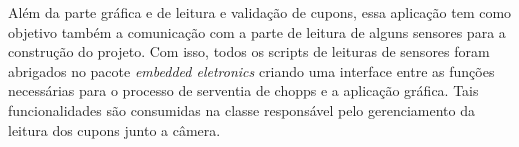             Além da parte gráfica e de leitura e validação de cupons, essa aplicação tem como objetivo
            também a comunicação com a parte de leitura de alguns sensores para a construção do projeto.
            Com isso, todos os scripts de leituras de sensores foram abrigados no pacote
            \textit{embedded eletronics} criando uma interface entre as funções necessárias para o processo
            de serventia de chopps e a aplicação gráfica. Tais funcionalidades são consumidas na classe
            responsável pelo gerenciamento da leitura dos cupons junto a câmera.